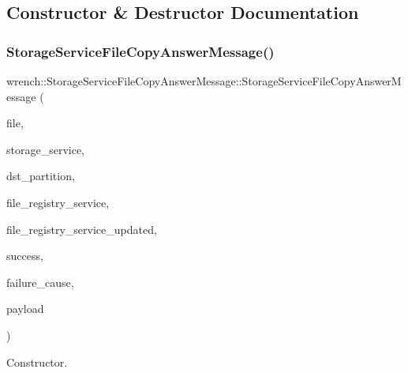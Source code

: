 \subsection{Constructor \& Destructor Documentation}
\mbox{\label{classwrench_1_1_storage_service_file_copy_answer_message_a6849b485ea05a016cb88e08f0b29748d}} 
\subsubsection{\texorpdfstring{Storage\+Service\+File\+Copy\+Answer\+Message()}{StorageServiceFileCopyAnswerMessage()}}
{\footnotesize\ttfamily wrench\+::\+Storage\+Service\+File\+Copy\+Answer\+Message\+::\+Storage\+Service\+File\+Copy\+Answer\+Message (\begin{DoxyParamCaption}\item[{\hyperlink{classwrench_1_1_workflow_file}{Workflow\+File} $\ast$}]{file,  }\item[{\hyperlink{classwrench_1_1_storage_service}{Storage\+Service} $\ast$}]{storage\+\_\+service,  }\item[{std\+::string}]{dst\+\_\+partition,  }\item[{\hyperlink{classwrench_1_1_file_registry_service}{File\+Registry\+Service} $\ast$}]{file\+\_\+registry\+\_\+service,  }\item[{bool}]{file\+\_\+registry\+\_\+service\+\_\+updated,  }\item[{bool}]{success,  }\item[{std\+::shared\+\_\+ptr$<$ \hyperlink{classwrench_1_1_failure_cause}{Failure\+Cause} $>$}]{failure\+\_\+cause,  }\item[{double}]{payload }\end{DoxyParamCaption})}



Constructor. 


